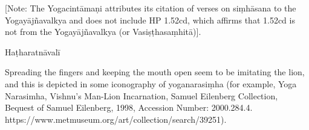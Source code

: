 \begin{ekdosis}
\begin{testimonia}[hp01_050]
\begin{versinnote}
\end{versinnote}

[Note: The Yogacintāmaṇi attributes its citation of verses on siṃhāsana to the Yogayājñavalkya and does not include HP 1.52cd, which affirms that 1.52cd is not from the Yogayājñavalkya (or Vasiṣṭhasaṃhitā)].

Haṭharatnāvalī

\begin{versinnote}
\end{versinnote}

\end{testimonia}

\begin{philcomm}[hp01_051]

Spreading the fingers and keeping the mouth open seem to be imitating the lion, and this is depicted in some iconography of yoganarasiṃha (for example, Yoga Narasimha, Vishnu's Man-Lion Incarnation, Samuel Eilenberg Collection, Bequest of Samuel Eilenberg, 1998, Accession Number: 2000.284.4. https://www.metmuseum.org/art/collection/search/39251).  
\end{philcomm}



\end{ekdosis}
